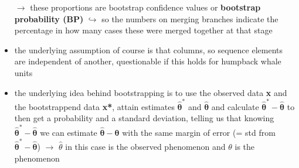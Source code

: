 \documentclass[12pt,a4paper]{article}
\begin{document}
\begin{itemize}
  \newline \indent $\longrightarrow$ these proportions are bootstrap confidence values or \textbf{bootstrap probability (BP)}
  \newline \indent $\hookrightarrow$ so the numbers on merging branches indicate the percentage in how many cases these were merged together at that stage 
  \item the underlying assumption of course is that columns, so sequence elements are independent of another, questionable if this holds for humpback whale units
  \item the underlying idea behind bootstrapping is to use the observed data \textbf{x} and the bootstrappend data \textbf{x*}, attain estimates $\mathbf{\hat \theta^*}$ and $\mathbf{\hat \theta}$ and calculate $\mathbf{\hat \theta^*} - \mathbf{\hat \theta}$ to then get a probability and a standard deviation, telling us that knowing $\mathbf{\hat \theta^*} - \mathbf{\hat \theta}$ we can estimate $\mathbf{\hat \theta} - \mathbf{\theta}$ with the same margin of error (= std from $\mathbf{\hat \theta^*} - \mathbf{\hat \theta}$)
  \newline \indent $\longrightarrow$ $\hat \theta$ in this case is the observed phenomenon and $\theta$ is the phenomenon
\end{itemize}
\end{document}
